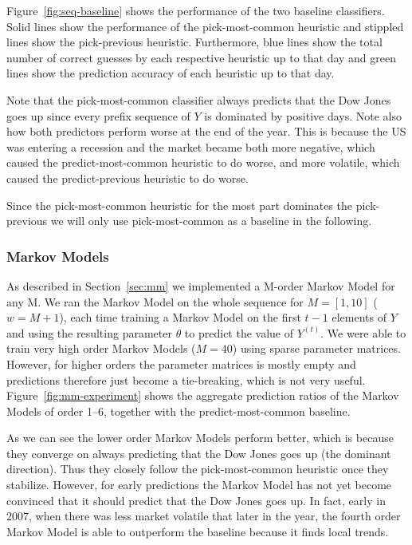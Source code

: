 \documentclass[10pt, twocolumn]{article}
\begin{document}
Figure~\ref{fig:seq-baseline} shows the performance of the two baseline classifiers.
Solid lines show the performance of the pick-most-common heuristic and stippled lines show the pick-previous heuristic.
Furthermore, blue lines show the total number of correct guesses by each respective heuristic up to that day and green lines show the prediction accuracy of each heuristic up to that day.

Note that the pick-most-common classifier always predicts that the Dow Jones goes up since every prefix sequence of $Y$ is dominated by positive days. 
Note also how both predictors perform worse at the end of the year.
This is because the US was entering a recession and the market became both more negative, which caused the predict-most-common heuristic to do worse, and more volatile, which caused the predict-previous heuristic to do worse.

Since the pick-most-common heuristic for the most part dominates the pick-previous we will only use pick-most-common as a baseline in the following.


\subsubsection{Markov Models}
\label{mm-eval}

As described in Section~\ref{sec:mm} we implemented a M-order Markov Model for any M.
We ran the Markov Model on the whole sequence for $M=[1,10]$ ($w=M+1$), each time training a Markov Model on the first $t-1$ elements of $Y$ and using the resulting parameter $\theta$ to predict the value of $Y^{(t)}$.
We were able to train very high order Markov Models ($M=40$) using sparse parameter matrices.
However, for higher orders the parameter matrices is mostly empty and predictions therefore just become a tie-breaking, which is not very useful.
Figure~\ref{fig:mm-experiment} shows the aggregate prediction ratios of the Markov Models of order 1--6, together with the predict-most-common baseline.

As we can see the lower order Markov Models perform better, which is because they converge on always predicting that the Dow Jones goes up (the dominant direction). Thus they closely follow the pick-most-common heuristic once they stabilize.
However, for early predictions the Markov Model has not yet become convinced that it should predict that the Dow Jones goes up. In fact, early in 2007, when there was less market volatile that later in the year, the fourth order Markov Model is able to outperform the baseline because it finds local trends.
\end{document}
